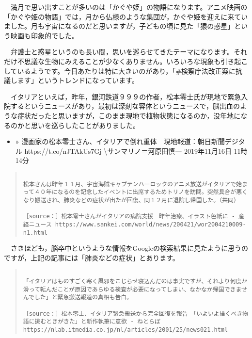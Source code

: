 \documentclass[]{ltjarticle}
\providecommand{\tightlist}{%
  \setlength{\itemsep}{0pt}\setlength{\parskip}{0pt}}
\begin{document}
　満月で思い出すことが多いのは「かぐや姫」の物語になります。アニメ映画の「かぐや姫の物語」では，月から仏様のような集団が，かぐや姫を迎えに来ていました。月も宇宙になるのだと思いますが，子どもの頃に見た「猿の惑星」という映画も印象的でした。

　弁護士と惑星というのも長い間，思いを巡らせてきたテーマになります。それだけ不思議な生物にみえることが少なくありません。いろいろな現象も引き起こしているようです。今日あたりは特に大きいのがあり，「\#検察庁法改正案に抗議します」というトレンドになっています。

　イタリアといえば，昨年，銀河鉄道９９９の作者，松本零士氏が現地で緊急入院するというニュースがあり，最初は深刻な容体というニュースで，脳出血のような症状だったと思いますが，このまま現地で植物状態になるのか，没年地になるのかと思いを巡らしたことがありました。

\begin{itemize}
\tightlist
\item
  » 漫画家の松本零士さん、イタリアで倒れ重体　現地報道：朝日新聞デジタル
  https://t.co/nJTAkUs7Gj \textbackslash サンマリノ＝河原田慎一 2019年11月16日
  11時14分
\end{itemize}

\begingroup\fontsize{9pt}{10pt}\selectfont
\begin{quote}
\begin{verbatim}

松本さんは昨年１１月、宇宙海賊キャプテンハーロックのアニメ放送がイタリアで始まって４０年になるのを記念したイベントに出席するためトリノを訪問。突然具合が悪くなり搬送され、肺炎などの症状が出たが回復、同１２月に退院し帰国した。（共同）

［source：］松本零士さんがイタリアの病院支援　昨年治療、イラスト色紙に - 産経ニュース https://www.sankei.com/world/news/200421/wor2004210009-n1.html

\end{verbatim}
\end{quote}\endgroup


　さきほども，脳卒中というような情報をGoogleの検索結果に見たように思うのですが，上記の記事には「肺炎などの症状」とあります。

\begingroup\fontsize{9pt}{10pt}\selectfont
\begin{quote}
\begin{verbatim}

「イタリアはものすごく寒く風邪をこじらせ寝込んだのは事実ですが、それより何度か滑って転んだことが原因であらゆる検査が必要になってしまい、なかなか帰国できませんでした」と緊急搬送報道の真相も告白。

［source：］松本零士、イタリア緊急搬送から完全回復を報告　「いよいよ描くべき物語に挑むときがきた」と新作執筆に意欲 - ねとらぼ https://nlab.itmedia.co.jp/nl/articles/2001/25/news021.html

\end{verbatim}
\end{quote}\endgroup
\end{document}
